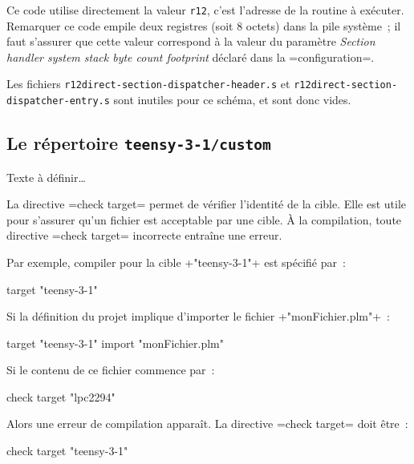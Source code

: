 Ce code utilise directement la valeur \texttt{r12}, c'est l'adresse de la routine à exécuter. Remarquer ce code empile deux registres (soit 8 octets) dans la pile système~; il faut s'assurer que cette valeur correspond à la valeur du paramètre \emph{Section handler system stack byte count footprint} déclaré dans la \plm=configuration=.


Les fichiers \texttt{r12direct-section-dispatcher-header.s} et \texttt{r12direct-section-dispatcher-entry.s} sont inutiles pour ce schéma, et sont donc vides.










\subsection{Le répertoire \texttt{teensy-3-1/custom}}

Texte à définir…





La directive \plm=check target= permet de vérifier l'identité de la cible. Elle est utile pour s'assurer qu'un fichier est acceptable par une cible. À la compilation, toute directive \plm=check target= incorrecte entraîne une erreur.

Par exemple, compiler pour la cible \plm+"teensy-3-1"+ est spécifié par~:

\begin{PLM}
target "teensy-3-1"
\end{PLM}

Si la définition du projet implique d'importer le fichier \plm+"monFichier.plm"+~:

\begin{PLM}
target "teensy-3-1"
import "monFichier.plm"
\end{PLM}

Si le contenu de ce fichier commence par~:
\begin{PLM}
check target "lpc2294"
\end{PLM}

Alors une erreur de compilation apparaît. La directive \plm=check target= doit être~:
\begin{PLM}
check target "teensy-3-1"
\end{PLM}

